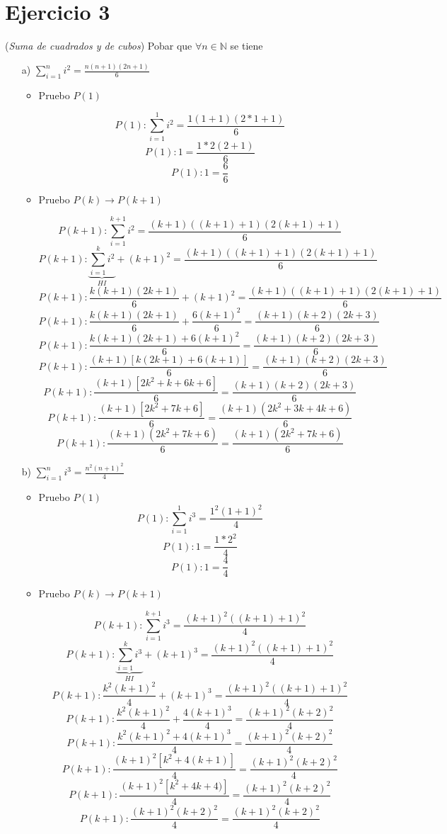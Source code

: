 \documentclass[10pt,a4paper]{article}
\begin{document}
\section*{Ejercicio 3}
(\textit{Suma de cuadrados y de cubos}) Pobar que $\forall n\in \mathbb{N}$ se tiene
\begin{enumerate}
\item[a)]$\sum^{n}_{i=1}i^{2}=\frac{n(n+1)(2n+1)}{6}$
	\begin{itemize}
	\item Pruebo $P(1)$
	
	$$P(1):\sum^{1}_{i=1}i^{2}=\frac{1(1+1)(2*1+1)}{6}$$
	$$P(1):1=\frac{1*2(2+1)}{6}$$
	$$P(1):1=\frac{6}{6}$$
	
	\item Pruebo $P(k)\rightarrow P(k+1)$
	
	$$P(k+1):\sum^{k+1}_{i=1}i^{2}=\frac{(k+1)((k+1)+1)(2(k+1)+1)}{6}$$
	$$P(k+1):\underbrace{\sum^{k}_{i=1}i^{2}}_{HI}+(k+1)^{2}=\frac{(k+1)((k+1)+1)(2(k+1)+1)}{6}$$
	$$P(k+1):  \frac{k(k+1)(2k+1)}{6}    +(k+1)^{2}=\frac{(k+1)((k+1)+1)(2(k+1)+1)}{6}$$
	$$P(k+1):  \frac{k(k+1)(2k+1)}{6}    + \frac{6(k+1)^{2}}{6}  =\frac{(k+1)(k+2)(2k+3)}{6}$$
	$$P(k+1):  \frac{k(k+1)(2k+1)+6(k+1)^{2}}{6}  =\frac{(k+1)(k+2)(2k+3)}{6}$$
	$$P(k+1):  \frac{(k+1)[k(2k+1)+6(k+1)]}{6}  =\frac{(k+1)(k+2)(2k+3)}{6}$$
	$$P(k+1):  \frac{(k+1)[2k^{2}+k+6k+6]}{6}  =\frac{(k+1)(k+2)(2k+3)}{6}$$
	$$P(k+1):  \frac{(k+1)[2k^{2}+7k+6]}{6}  =\frac{(k+1)(2k^{2}+3k+4k+6)}{6}$$
	$$P(k+1):  \frac{(k+1)(2k^{2}+7k+6)}{6}  =\frac{(k+1)(2k^{2}+7k+6)}{6}$$
	
	\end{itemize}
	
\item[b)]$\sum^{n}_{i=1}i^{3}=\frac{n^{2}(n+1)^{2}}{4}$
	\begin{itemize}
	\item Pruebo $P(1)$
	$$P(1):\sum^{1}_{i=1}i^{3}=\frac{1^{2}(1+1)^{2}}{4}$$
	$$P(1):1 =\frac{1*2^{2}}{4}$$
	$$P(1):1 =\frac{4}{4}$$
	
	\item Pruebo $P(k)\rightarrow P(k+1)$
	
	$$P(k+1):\sum^{k+1}_{i=1}i^{3}=\frac{(k+1)^{2}((k+1)+1)^{2}}{4}$$
	$$P(k+1):\underbrace{\sum^{k}_{i=1}i^{3}}_{HI}+(k+1)^{3}=\frac{(k+1)^{2}((k+1)+1)^{2}}{4}$$
	$$P(k+1): \frac{k^{2}(k+1)^{2}}{4}   +(k+1)^{3}=\frac{(k+1)^{2}((k+1)+1)^{2}}{4}$$
	$$P(k+1): \frac{k^{2}(k+1)^{2}}{4}   + \frac{4(k+1)^{3}}{4} =\frac{(k+1)^{2}(k+2)^{2}}{4}$$
	$$P(k+1): \frac{k^{2}(k+1)^{2}+4(k+1)^{3}}{4}   =\frac{(k+1)^{2}(k+2)^{2}}{4}$$
	$$P(k+1): \frac{(k+1)^{2}[k^{2}+4(k+1)]}{4}   =\frac{(k+1)^{2}(k+2)^{2}}{4}$$
	$$P(k+1): \frac{(k+1)^{2}[k^{2}+4k+4)]}{4}   =\frac{(k+1)^{2}(k+2)^{2}}{4}$$
	$$P(k+1): \frac{(k+1)^{2}(k+2)^{2}}{4}   =\frac{(k+1)^{2}(k+2)^{2}}{4}$$
	\end{itemize}
\end{enumerate}
\end{document}
